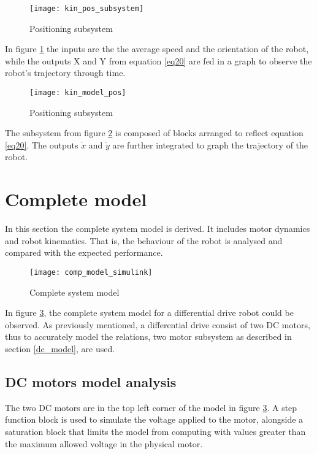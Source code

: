 \begin{figure}[h]
\centering
\texttt{[image: kin\_pos\_subsystem]}
\caption{Positioning subsystem}
\label{fig::pos_sub}
\end{figure} 

In figure \ref{fig::pos_sub} the inputs are the the average speed and the orientation of the robot, while the outputs X and Y from equation \ref{eq20} are fed in a graph to observe the robot's trajectory through time. 

\begin{figure}[h]
\centering
\texttt{[image: kin\_model\_pos]}
\caption{Positioning subsystem}
\label{fig::pos_model}
\end{figure} 

The subsystem from figure \ref{fig::pos_model} is composed of blocks arranged to reflect equation \ref{eq20}. The outputs $\dot{x}$ and $\dot{y}$ are further integrated to graph the trajectory of the robot.

\section{Complete model}

In this section the complete system model is derived. It includes motor dynamics and robot kinematics. That is, the behaviour of the robot is analysed and compared with the expected performance.

\begin{figure}[h]
\centering
\texttt{[image: comp\_model\_simulink]}
\caption{Complete system model}
\label{fig::com_model}
\end{figure} 

In figure \ref{fig::com_model}, the complete system model for a differential drive robot could be observed. As previously mentioned, a differential drive consist of two DC motors, thus to accurately model the relations, two motor subsystem as described in section \ref{dc_model}, are used. 

\subsection{DC motors model analysis} 

The two DC motors are in the top left corner of the model in figure \ref{fig::com_model}. A step function block is used to simulate the voltage applied to the motor, alongside a saturation block that limits the model from  computing with values greater than the maximum allowed voltage in the physical motor. 

